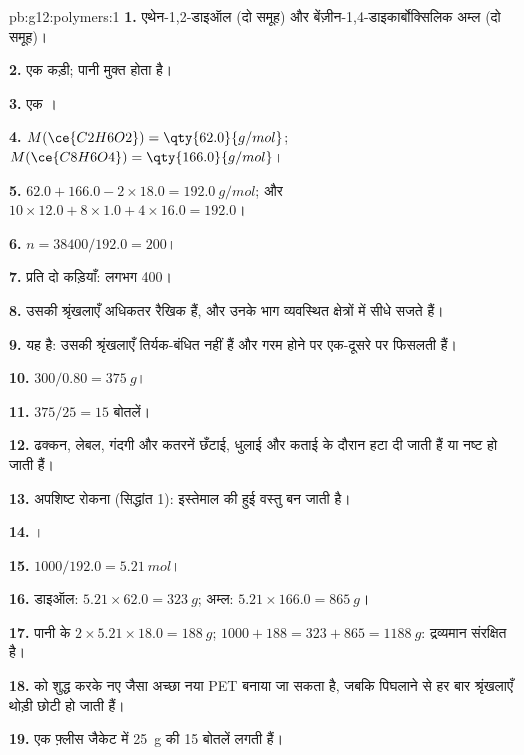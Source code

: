 \begin{solution}{pb:g12:polymers:1}
\textbf{1.} एथेन-1,2-डाइऑल (दो  समूह) और
बेंज़ीन-1,4-डाइकार्बोक्सिलिक अम्ल (दो  समूह)।

\textbf{2.} एक  कड़ी; पानी मुक्त होता है।

\textbf{3.} एक ।

\textbf{4.} $M(\ce{C2H6O2}) = \qty{62.0}{g/mol}$; $M(\ce{C8H6O4}) =
\qty{166.0}{g/mol}$।

\textbf{5.} $62.0 + 166.0 - 2 \times 18.0 = \qty{192.0}{g/mol}$; और
$10 \times 12.0 + 8 \times 1.0 + 4 \times 16.0 = 192.0$।

\textbf{6.} $n = 38400/192.0 = 200$।

\textbf{7.} प्रति  दो  कड़ियाँ: लगभग 400।

\textbf{8.} उसकी श्रृंखलाएँ अधिकतर रैखिक हैं, और उनके भाग व्यवस्थित
क्षेत्रों में सीधे सजते हैं।

\textbf{9.} यह  है: उसकी श्रृंखलाएँ तिर्यक-बंधित नहीं हैं और
गरम होने पर एक-दूसरे पर फिसलती हैं।

\textbf{10.} $300/0.80 = \qty{375}{g}$।

\textbf{11.} $375/25 = 15$ बोतलें।

\textbf{12.} ढक्कन, लेबल, गंदगी और कतरनें छँटाई, धुलाई और कताई के दौरान
हटा दी जाती हैं या नष्ट हो जाती हैं।

\textbf{13.} अपशिष्ट रोकना (सिद्धांत 1): इस्तेमाल की हुई वस्तु  बन जाती है।

\textbf{14.} ।

\textbf{15.} $1000/192.0 = \qty{5.21}{mol}$।

\textbf{16.} डाइऑल: $5.21 \times 62.0 = \qty{323}{g}$; अम्ल:
$5.21 \times 166.0 = \qty{865}{g}$।

\textbf{17.} पानी के $2 \times 5.21 \times 18.0 = \qty{188}{g}$;
$1000 + 188 = 323 + 865 = \qty{1188}{g}$: द्रव्यमान संरक्षित है।

\textbf{18.}  को शुद्ध करके नए जैसा अच्छा नया PET बनाया जा सकता है,
जबकि पिघलाने से हर बार श्रृंखलाएँ थोड़ी छोटी हो जाती हैं।

\textbf{19.} एक फ़्लीस जैकेट में \qty{25}{g} की 15 बोतलें लगती हैं।
\end{solution}
